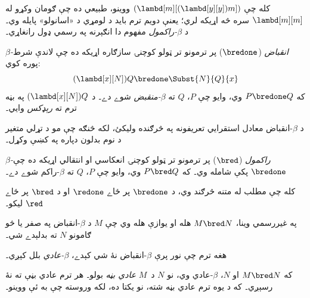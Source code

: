 \documentclass[../../../include/open-logic-section]{subfiles}
\begin{document}

کله چې $(\lambd[m][(\lambd[y][y]) m])$ ووينو، طبيعي ده چې
ګومان وکړو له $\lambd[m][m]$ سره څه اړيکه لري؛ يعنې دويم ترم
بايد د لومړي د «اسانولو» پايله وي۔ د \emph{$\beta$-راکمول}
مفهوم دا انګېرنه په رسمي ډول رانغاړي۔

\begin{defn} 
  \emph{$\beta$-انقباض} ($\bredone$) پر ترمونو تر ټولو کوچنۍ
  سازګاره اړيکه ده چې لاندې شرط پوره کوي:
  \[
    (\lambd[x][N])Q \bredone \Subst{N}{Q}{x} 
  \]
  که $P \bredone Q$ وي، وايو چې $P$، $Q$ ته
  \emph{$\beta$-منقبض} شوے دے۔ د $(\lambd[x][N])Q$
  په بڼه ترم ته \emph{رېډکس} وايي۔
\end{defn}

\begin{prob} 
  د $\beta$-انقباض معادل استقرايي تعريفونه په څرګنده وليکئ،
  لکه څنګه چې مو د تړلي متغير د نوم بدلون دپاره په
   کښې وکړل۔
\end{prob}
  
\begin{defn} 
  \emph{$\beta$-راکمول} ($\bred$) پر ترمونو تر ټولو کوچنۍ
  انعکاسي او انتقالي اړيکه ده چې $\bredone$ پکې شامله وي۔
  که $P \bred Q$ وي، وايو چې $P$، $Q$ ته
  $\beta$-راکم شوے دے۔
\end{defn}

کله چې مطلب له متنه څرګند وي، د $\bredone$ پر ځاے
$\redone$ او د $\bred$ پر ځاے $\red$ ليکو۔

په غيررسمي وينا، $M \bred N$ هله او يوازې هله وي چې
$M$ د $\beta$-انقباض په صفر يا څو ګامونو $N$ ته
بدلېدے شي۔

\begin{defn}
هغه ترم چې نور پرې $\beta$-انقباض نۀ شي کېدے،
\emph{$\beta$-عادي} بلل کېږي۔
\end{defn}

که $M \bred N$ او $N$، $\beta$-عادي وي، نو $N$
د~$M$ \emph{عادي بڼه} بولو۔ هر ترم عادي بڼې ته نۀ رسېږي۔ که د يوه ترم عادي بڼه شته،
نو يکتا ده، لکه وروسته چې به ئې ووينو۔
\end{document}
